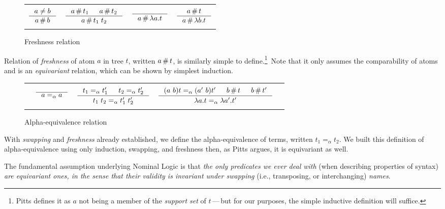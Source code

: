 \documentclass[english, mgr]{iithesis}
\renewcommand{\it}[1]{\textit{#1}}
\newcommand{\aequiv}{\ensuremath{=_\alpha}}
\newcommand{\mdash}{\,---\,}
\def\-{{\mdash}}
\begin{document}
\begin{figure}[htbp]
  \centering
    \begin{tabularx}{\textwidth}{|CCCC|}
      \hline & & & \\
      $
      \inference{
        a \cneq b
      }{
        a \cfresh b
      }
      $ & $
      \inference{
        a \cfresh t_1 & a \cfresh t_2
      }{
        a \cfresh t_1\;t_2
      }
      $ & $
      \inference{
      }{
        a \cfresh \lambda a . t
      }
      $ & $
      \inference{
        a \cfresh t
      }{
        a \cfresh \lambda b . t
      }
      $ \\ & & & \\ \hline
    \end{tabularx}
  \caption{Freshness relation}
  \label{fig:fresh}
\end{figure}
Relation of \it{freshness} of atom $a$ in tree $t$, written $a \,\#\, t$,
is similarly simple to define.\footnote{Pitts defines it as
$a$ not being a member of the \it{support set} of $t$\-but for our purposes, the simple inductive definition will suffice.}\
Note that it only assumes the comparability of atoms
and is an \it{equivariant} relation, which can be shown by simplest induction.

\begin{figure}[htbp]
  \centering
    \begin{tabularx}{\textwidth}{|ccCcc|}
    \hline & & & & \\ {} &
    $
    \inference{
      \text{}
    }{
      a \aequiv a
    }
    $ & $
    \inference{
      t_1 \aequiv t_1' & t_2 \aequiv t_2'
    }{
      t_1\;t_2 \aequiv t_1'\;t_2'
    }
    $ & $
    \inference{
      \permswap{a}{b}{t} \aequiv \permswap{a'}{b}{t'} & b \cfresh t & b \cfresh t'
    }{
      \lambda a . t \aequiv \lambda a' . t'
    }
    $ & {} \\ & & & & \\ \hline
    \end{tabularx}
  \caption{Alpha-equivalence relation}
  \label{fig:fresh}
\end{figure}
With \it{swapping} and \it{freshness} already established,
we define the alpha-equivalence of terms, written $t_1 \aequiv t_2$.
We built this definition of alpha-equivalence using only induction,
swapping, and freshness then, as Pitts argues, it is equivariant as well.
\\
\begin{mdframed}[frametitle={\textnormal{\footnotesize \textbf{\citeauthor{nominal-logic}}, \textit{\citetitle{nominal-logic}}\cite{nominal-logic}:}}]
The fundamental assumption underlying Nominal Logic is that \textit{the only predicates we ever deal with} (when describing properties of syntax) \textit{are equivariant ones, in the sense that their validity is invariant under swapping} (i.e., transposing, or interchanging) \textit{names}.
\end{mdframed}
\end{document}
